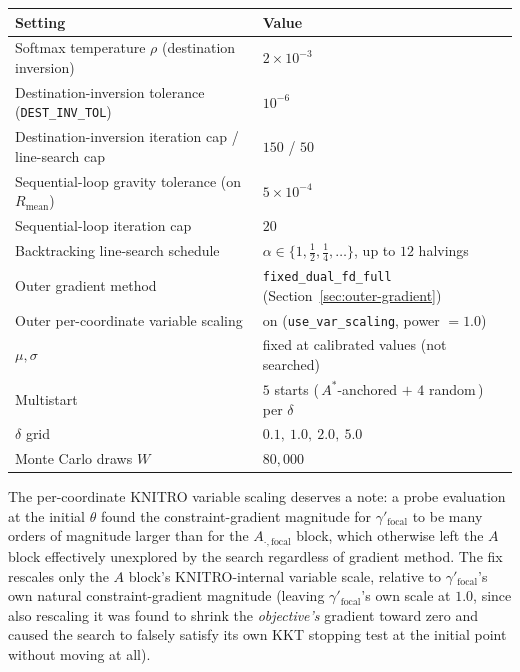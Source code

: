 \documentclass[11pt]{article}
\begin{document}
\begin{center}
\begin{tabular}{@{}ll@{}}
\toprule
Setting & Value \\
\midrule
Softmax temperature $\rho$ (destination inversion) & $2\times10^{-3}$ \\
Destination-inversion tolerance (\texttt{DEST\_INV\_TOL}) & $10^{-6}$ \\
Destination-inversion iteration cap / line-search cap & $150$ / $50$ \\
Sequential-loop gravity tolerance (on $R_{\mathrm{mean}}$) & $5\times10^{-4}$ \\
Sequential-loop iteration cap & $20$ \\
Backtracking line-search schedule & $\alpha\in\{1,\tfrac12,\tfrac14,\dots\}$, up to $12$ halvings \\
Outer gradient method & \texttt{fixed\_dual\_fd\_full} (Section~\ref{sec:outer-gradient}) \\
Outer per-coordinate variable scaling & on (\texttt{use\_var\_scaling}, power $=1.0$) \\
$\mu,\sigma$ & fixed at calibrated values (not searched) \\
Multistart & $5$ starts (\,$A^*$-anchored $+$ $4$ random\,) per $\delta$ \\
$\delta$ grid & $0.1,\ 1.0,\ 2.0,\ 5.0$ \\
Monte Carlo draws $W$ & $80{,}000$ \\
\bottomrule
\end{tabular}
\end{center}

The per-coordinate KNITRO variable scaling deserves a note: a probe evaluation at the initial
$\theta$ found the constraint-gradient magnitude for $\gamma'_{\text{focal}}$ to be many orders of
magnitude larger than for the $A_{\cdot,\text{focal}}$ block, which otherwise left the $A$ block
effectively unexplored by the search regardless of gradient method. The fix rescales only the $A$
block's KNITRO-internal variable scale, relative to $\gamma'_{\text{focal}}$'s own natural
constraint-gradient magnitude (leaving $\gamma'_{\text{focal}}$'s own scale at $1.0$, since also
rescaling it was found to shrink the \emph{objective's} gradient toward zero and caused the search
to falsely satisfy its own KKT stopping test at the initial point without moving at all).
\end{document}
